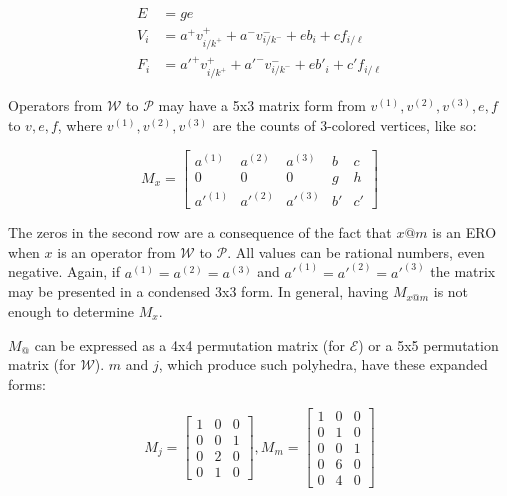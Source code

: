 \documentclass{amsart}[12pt]
\begin{document}
\begin{equation}
  \begin{split}
  E & = ge \\
  V_i & = a^+ v^+_{i/k^+} + a^- v^-_{i/k^-} + e b_i + c f_{i/\ell} \\
  F_i & = a'^+ v^+_{i/k^+} + a'^- v^-_{i/k^-} + e b'_i + c' f_{i/\ell}
  \end{split}
\end{equation}

Operators from $\mathcal{W}$ to $\mathcal{P}$ may have a 5x3 matrix form
from $v^{(1)}, v^{(2)}, v^{(3)}, e, f$ to $v, e, f$, where $v^{(1)}, v^{(2)},
v^{(3)}$ are the counts of 3-colored vertices, like so:

\begin{equation}
  M_x = \begin{bmatrix}
  a^{(1)} & a^{(2)} & a^{(3)} & b & c \\
  0 & 0 & 0 & g & h \\
  {a'}^{(1)} & {a'}^{(2)} & {a'}^{(3)} & b' & c' \end{bmatrix}
\end{equation}

The zeros in the second row are a consequence of the fact that $x@m$ is an ERO
when $x$ is an operator from $\mathcal{W}$ to $\mathcal{P}$. All values can be
rational numbers, even negative. Again, if $a^{(1)} = a^{(2)} = a^{(3)}$ and
$a'^{(1)} = a'^{(2)} = a'^{(3)}$ the matrix may be presented in a condensed 3x3
form. In general, having $M_{x@m}$ is not enough to determine $M_x$.

$M_@$ can be expressed as a 4x4 permutation matrix (for $\mathcal{E}$)
or a 5x5 permutation matrix (for $\mathcal{W}$). $m$ and $j$,
which produce such polyhedra, have these expanded forms:

\begin{equation}
  M_j = \begin{bmatrix}
  1 & 0 & 0 \\
  0 & 0 & 1 \\
  0 & 2 & 0 \\
  0 & 1 & 0 \end{bmatrix},
  M_m = \begin{bmatrix}
  1 & 0 & 0 \\
  0 & 1 & 0 \\
  0 & 0 & 1 \\
  0 & 6 & 0 \\
  0 & 4 & 0 \end{bmatrix}
\end{equation}
\end{document}
